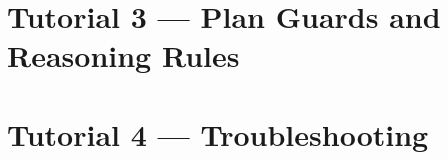 \section{Tutorial 3 --- Plan Guards and Reasoning Rules}

{
  \let\section\subsection
  \let\subsection\subsubsection
  \let\subsubsection\paragraph
  
  
  }

\section{Tutorial 4 --- Troubleshooting}

{
  \let\section\subsection
  \let\subsection\subsubsection
  \let\subsubsection\paragraph
  
  
  }

